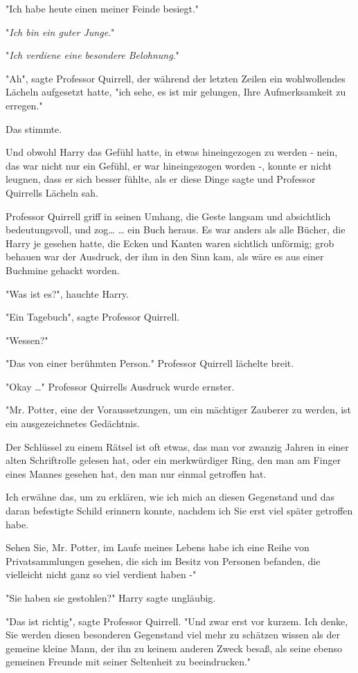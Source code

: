 {"Ich habe heute einen meiner Feinde besiegt."

"\emph{Ich bin ein guter Junge}."

"\emph{Ich verdiene eine besondere Belohnung}."

"Ah", sagte Professor Quirrell, der während der letzten Zeilen ein wohlwollendes Lächeln aufgesetzt hatte, "ich sehe, es ist mir gelungen, Ihre Aufmerksamkeit zu erregen."

Das stimmte.

Und obwohl Harry das Gefühl hatte, in etwas hineingezogen zu werden - nein, das war nicht nur ein Gefühl, er war hineingezogen worden -, konnte er nicht leugnen, dass er sich besser fühlte, als er diese Dinge sagte und Professor Quirrells Lächeln sah.

Professor Quirrell griff in seinen Umhang, die Geste langsam und absichtlich bedeutungsvoll, und zog… … ein Buch heraus. Es war anders als alle Bücher, die Harry je gesehen hatte, die Ecken und Kanten waren sichtlich unförmig; grob behauen war der Ausdruck, der ihm in den Sinn kam, als wäre es aus einer Buchmine gehackt worden.

"Was ist es?", hauchte Harry.

"Ein Tagebuch", sagte Professor Quirrell.

"Wessen?"

"Das von einer berühmten Person." Professor Quirrell lächelte breit.

"Okay …" Professor Quirrells Ausdruck wurde ernster.

"Mr. Potter, eine der Voraussetzungen, um ein mächtiger Zauberer zu werden, ist ein ausgezeichnetes Gedächtnis.

Der Schlüssel zu einem Rätsel ist oft etwas, das man vor zwanzig Jahren in einer alten Schriftrolle gelesen hat, oder ein merkwürdiger Ring, den man am Finger eines Mannes gesehen hat, den man nur einmal getroffen hat.

Ich erwähne das, um zu erklären, wie ich mich an diesen Gegenstand und das daran befestigte Schild erinnern konnte, nachdem ich Sie erst viel später getroffen habe.

Sehen Sie, Mr. Potter, im Laufe meines Lebens habe ich eine Reihe von Privatsammlungen gesehen, die sich im Besitz von Personen befanden, die vielleicht nicht ganz so viel verdient haben -"

"Sie haben sie gestohlen?" Harry sagte ungläubig.

"Das ist richtig", sagte Professor Quirrell. "Und zwar erst vor kurzem. Ich denke, Sie werden diesen besonderen Gegenstand viel mehr zu schätzen wissen als der gemeine kleine Mann, der ihn zu keinem anderen Zweck besaß, als seine ebenso gemeinen Freunde mit seiner Seltenheit zu beeindrucken."

}
